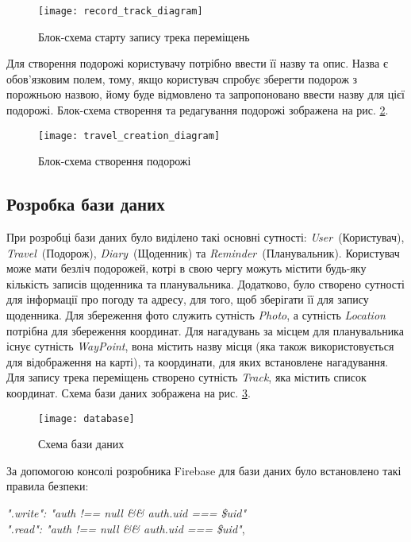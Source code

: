 \documentclass[../main.tex]{subfiles}
\begin{document}
\begin{figure}[H]
	\centering
	\texttt{[image: record\_track\_diagram]}
	\caption{Блок-схема старту запису трека переміщень}
	\label{diagram:start_tracking}
\end{figure}

Для створення подорожі користувачу потрібно ввести її назву та опис. Назва є обов'язковим полем, тому, якщо користувач спробує зберегти подорож з порожньою назвою, йому буде відмовлено та запропоновано ввести назву для цієї подорожі. Блок-схема створення та редагування подорожі зображена на рис. \ref{diagram:travel_creation}.

\begin{figure}[H]
	\centering
	\texttt{[image: travel\_creation\_diagram]}
	\caption{Блок-схема створення подорожі}
	\label{diagram:travel_creation}
\end{figure}

\subsection{Розробка бази даних}


При розробці бази даних було виділено такі основні сутності: \textit{User}~(Користувач), \textit{Travel}~(Подорож), \textit{Diary}~(Щоденник) та \textit{Reminder}~(Планувальник). Користувач може мати безліч подорожей, котрі в свою чергу можуть містити будь-яку кількість записів щоденника та планувальника. Додатково, було створено сутності для інформації про погоду та адресу, для того, щоб зберігати її для запису щоденника. Для збереження фото служить сутність \textit{Photo}, а сутність \textit{Location} потрібна для збереження координат. Для нагадувань за місцем для планувальника існує сутність \textit{WayPoint}, вона містить назву місця (яка також використовується для відображення на карті), та  координати, для яких встановлене нагадування. Для запису трека переміщень створено сутність \textit{Track}, яка містить список координат. Схема бази даних зображена на рис. \ref{diagram:database}.

\begin{figure}[H]
	\centering
	\texttt{[image: database]}
	\caption{Схема бази даних}
	\label{diagram:database}
\end{figure}

За допомогою консолі розробника Firebase для бази даних було встановлено такі правила безпеки:
\begin{center}
	\textit{".write": "auth !== null \&\& auth.uid === \$uid"}\\
	\textit{".read": "auth !== null \&\& auth.uid === \$uid"},
\end{center}
\end{document}
